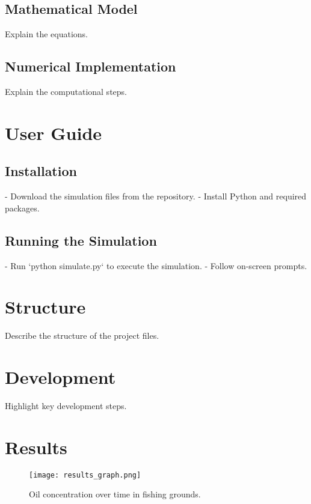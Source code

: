 \documentclass{article}
\begin{document}
\subsection{Mathematical Model}
Explain the equations.
\subsection{Numerical Implementation}
Explain the computational steps.

\section{User Guide}
\subsection{Installation}
- Download the simulation files from the repository.
- Install Python and required packages.
\subsection{Running the Simulation}
- Run `python simulate.py` to execute the simulation.
- Follow on-screen prompts.

\section{Structure}
Describe the structure of the project files.

\section{Development}
Highlight key development steps.

\section{Results}
\begin{figure}[h!]
\centering
\texttt{[image: results\_graph.png]}
\caption{Oil concentration over time in fishing grounds.}
\label{fig:results}
\end{figure}
\end{document}
